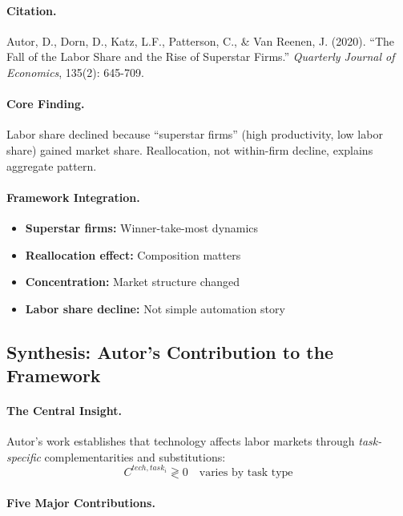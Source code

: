 \paragraph{Citation.}
Autor, D., Dorn, D., Katz, L.F., Patterson, C., \& Van Reenen, J. (2020).
``The Fall of the Labor Share and the Rise of Superstar Firms.''
\emph{Quarterly Journal of Economics}, 135(2): 645-709.

\paragraph{Core Finding.}
Labor share declined because ``superstar firms'' (high productivity,
low labor share) gained market share. Reallocation, not within-firm
decline, explains aggregate pattern.

\paragraph{Framework Integration.}
\begin{itemize}
  \item \textbf{Superstar firms:} Winner-take-most dynamics
  \item \textbf{Reallocation effect:} Composition matters
  \item \textbf{Concentration:} Market structure changed
  \item \textbf{Labor share decline:} Not simple automation story
\end{itemize}

\subsection{Synthesis: Autor's Contribution to the Framework}

\paragraph{The Central Insight.}
Autor's work establishes that technology affects labor markets through
\emph{task-specific} complementarities and substitutions:
\begin{equation}
  C^{tech,task_i} \gtrless 0 \quad \text{varies by task type}
\end{equation}

\paragraph{Five Major Contributions.}

